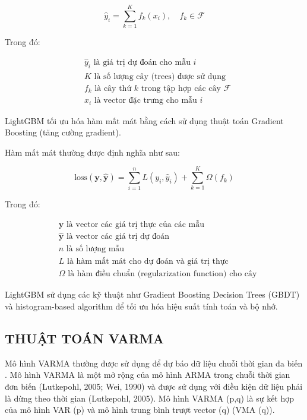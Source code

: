 \documentclass[conference]{IEEEtran}
\begin{document}
\[
\hat{y}_i = \sum_{k=1}^{K} f_k(x_i), \quad f_k \in \mathcal{F}
\]

Trong đó:

\begin{align*}
&\hat{y}_i \text{ là giá trị dự đoán cho mẫu } i \\
&K \text{ là số lượng cây (trees) được sử dụng} \\
&f_k \text{ là cây thứ } k \text{ trong tập hợp các cây } \mathcal{F} \\
&x_i \text{ là vector đặc trưng cho mẫu } i
\end{align*}

LightGBM tối ưu hóa hàm mất mát bằng cách sử dụng thuật toán Gradient Boosting (tăng cường gradient).

Hàm mất mát thường được định nghĩa như sau:

\[
\text{loss}(\mathbf{y}, \hat{\mathbf{y}}) = \sum_{i=1}^{n} L(y_i, \hat{y}_i) + \sum_{k=1}^{K} \Omega(f_k)
\]

Trong đó:

\begin{align*}
&\mathbf{y} \text{ là vector các giá trị thực của các mẫu} \\
&\hat{\mathbf{y}} \text{ là vector các giá trị dự đoán} \\
&n \text{ là số lượng mẫu} \\
&L \text{ là hàm mất mát cho dự đoán và giá trị thực} \\
&\Omega \text{ là hàm điều chuẩn (regularization function) cho cây}
\end{align*}

LightGBM sử dụng các kỹ thuật như Gradient Boosting Decision Trees (GBDT) và histogram-based algorithm để tối ưu hóa hiệu suất tính toán và bộ nhớ.
\subsection{THUẬT TOÁN VARMA}
Mô hình VARMA thường được sử dụng để dự báo dữ liệu chuỗi thời gian đa biến . Mô hình VARMA là một mở rộng của mô hình ARMA trong chuỗi thời gian đơn biến (Lutkepohl, 2005; Wei, 1990) và được sử dụng với điều kiện dữ liệu phải là dừng theo thời gian (Lutkepohl, 2005). Mô hình VARMA (p,q) là sự kết hợp của mô hình VAR (p) và mô hình trung bình trượt vector (q) (VMA (q)).\\
 
\end{document}
